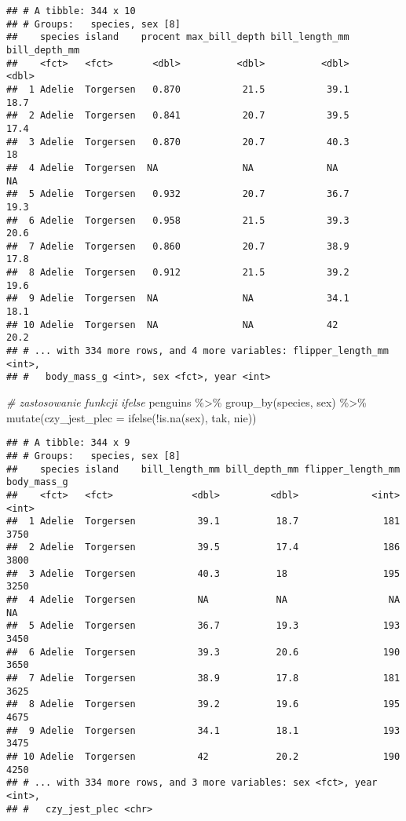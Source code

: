 \documentclass[
]{book}
\newenvironment{Shaded}{\begin{snugshade}}{\end{snugshade}}
\newcommand{\AttributeTok}[1]{\textcolor[rgb]{0.77,0.63,0.00}{#1}}
\newcommand{\CommentTok}[1]{\textcolor[rgb]{0.56,0.35,0.01}{\textit{#1}}}
\newcommand{\FunctionTok}[1]{\textcolor[rgb]{0.00,0.00,0.00}{#1}}
\newcommand{\NormalTok}[1]{#1}
\newcommand{\SpecialCharTok}[1]{\textcolor[rgb]{0.00,0.00,0.00}{#1}}
\newcommand{\StringTok}[1]{\textcolor[rgb]{0.31,0.60,0.02}{#1}}
\begin{document}
\begin{verbatim}
## # A tibble: 344 x 10
## # Groups:   species, sex [8]
##    species island    procent max_bill_depth bill_length_mm bill_depth_mm
##    <fct>   <fct>       <dbl>          <dbl>          <dbl>         <dbl>
##  1 Adelie  Torgersen   0.870           21.5           39.1          18.7
##  2 Adelie  Torgersen   0.841           20.7           39.5          17.4
##  3 Adelie  Torgersen   0.870           20.7           40.3          18  
##  4 Adelie  Torgersen  NA               NA             NA            NA  
##  5 Adelie  Torgersen   0.932           20.7           36.7          19.3
##  6 Adelie  Torgersen   0.958           21.5           39.3          20.6
##  7 Adelie  Torgersen   0.860           20.7           38.9          17.8
##  8 Adelie  Torgersen   0.912           21.5           39.2          19.6
##  9 Adelie  Torgersen  NA               NA             34.1          18.1
## 10 Adelie  Torgersen  NA               NA             42            20.2
## # ... with 334 more rows, and 4 more variables: flipper_length_mm <int>,
## #   body_mass_g <int>, sex <fct>, year <int>
\end{verbatim}

\begin{Shaded}
\begin{Highlighting}[]
\CommentTok{\# zastosowanie funkcji ifelse}
\NormalTok{penguins }\SpecialCharTok{\%\textgreater{}\%} \FunctionTok{group\_by}\NormalTok{(species, sex) }\SpecialCharTok{\%\textgreater{}\%} \FunctionTok{mutate}\NormalTok{(}\AttributeTok{czy\_jest\_plec =} \FunctionTok{ifelse}\NormalTok{(}\SpecialCharTok{!}\FunctionTok{is.na}\NormalTok{(sex), }\StringTok{\textquotesingle{}tak\textquotesingle{}}\NormalTok{, }\StringTok{\textquotesingle{}nie\textquotesingle{}}\NormalTok{))}
\end{Highlighting}
\end{Shaded}

\begin{verbatim}
## # A tibble: 344 x 9
## # Groups:   species, sex [8]
##    species island    bill_length_mm bill_depth_mm flipper_length_mm body_mass_g
##    <fct>   <fct>              <dbl>         <dbl>             <int>       <int>
##  1 Adelie  Torgersen           39.1          18.7               181        3750
##  2 Adelie  Torgersen           39.5          17.4               186        3800
##  3 Adelie  Torgersen           40.3          18                 195        3250
##  4 Adelie  Torgersen           NA            NA                  NA          NA
##  5 Adelie  Torgersen           36.7          19.3               193        3450
##  6 Adelie  Torgersen           39.3          20.6               190        3650
##  7 Adelie  Torgersen           38.9          17.8               181        3625
##  8 Adelie  Torgersen           39.2          19.6               195        4675
##  9 Adelie  Torgersen           34.1          18.1               193        3475
## 10 Adelie  Torgersen           42            20.2               190        4250
## # ... with 334 more rows, and 3 more variables: sex <fct>, year <int>,
## #   czy_jest_plec <chr>
\end{verbatim}
\end{document}
